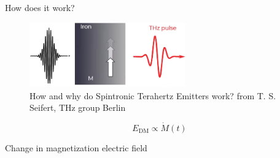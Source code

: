 \documentclass[aspectratio=1610, 9pt]{beamer}
\begin{document}
\begin{frame}{How does it work?}
  \begin{center}
    \begin{figure}
    \caption{\textcolor{tugreen}{How and why do Spintronic Terahertz Emitters work?} from T. S. Seifert, THz group Berlin}
    \vspace{0.3in}
    \includegraphics[width=0.6\textwidth]{pics/quenching.png}
    \end{figure}
  \end{center}
  \begin{equation*}
    E_\text{DM} \propto \dot{M}(t)
  \end{equation*}
  \begin{center}
    \Large Change in magnetization \rightarrow electric field
  \end{center}
\end{frame}
\end{document}
